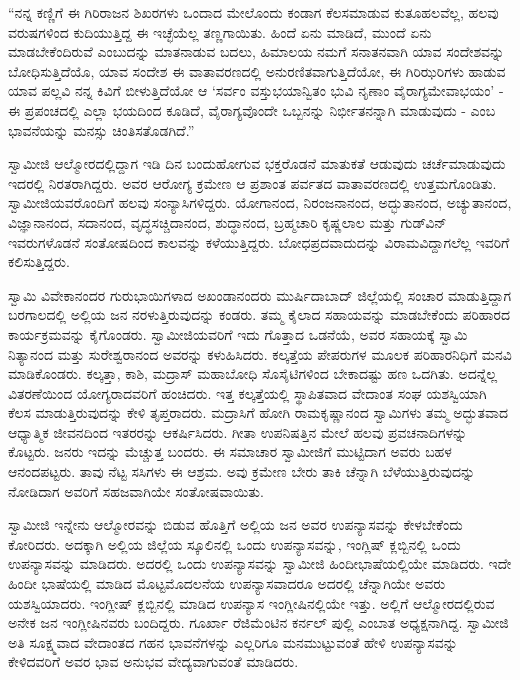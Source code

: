  “ನನ್ನ ಕಣ್ಣಿಗೆ ಈ ಗಿರಿರಾಜನ ಶಿಖರಗಳು ಒಂದಾದ ಮೇಲೊಂದು ಕಂಡಾಗ ಕೆಲಸಮಾಡುವ ಕುತೂಹಲವೆಲ್ಲ, ಹಲವು ವರುಷಗಳಿಂದ ಕುದಿಯುತ್ತಿದ್ದ ಈ ಇಚ್ಛೆಯೆಲ್ಲ ತಣ್ಣಗಾಯಿತು. ಹಿಂದೆ ಏನು ಮಾಡಿದೆ, ಮುಂದೆ ಏನು ಮಾಡಬೇಕೆಂದಿರುವೆ ಎಂಬುದನ್ನು ಮಾತನಾಡುವ ಬದಲು, ಹಿಮಾಲಯ ನಮಗೆ ಸನಾತನವಾಗಿ ಯಾವ ಸಂದೇಶವನ್ನು ಬೋಧಿಸುತ್ತಿದೆಯೊ, ಯಾವ ಸಂದೇಶ ಈ ವಾತಾವರಣದಲ್ಲಿ ಅನುರಣಿತವಾಗುತ್ತಿದೆಯೋ, ಈ ಗಿರಿಝರಿಗಳು ಹಾಡುವ ಯಾವ ಪಲ್ಲವಿ ನನ್ನ ಕಿವಿಗೆ ಬೀಳುತ್ತಿದೆಯೋ ಆ ‘ಸರ್ವಂ ವಸ್ತುಭಯಾನ್ವಿತಂ ಭುವಿ ನೃಣಾಂ ವೈರಾಗ್ಯಮೇವಾಭಯಂ’ - ಈ ಪ್ರಪಂಚದಲ್ಲಿ ಎಲ್ಲಾ ಭಯದಿಂದ ಕೂಡಿದೆ, ವೈರಾಗ್ಯವೊಂದೇ ಒಬ್ಬನನ್ನು ನಿರ್ಭೀತನನ್ನಾಗಿ ಮಾಡುವುದು - ಎಂಬ ಭಾವನೆಯನ್ನು ಮನಸ್ಸು ಚಿಂತಿಸತೊಡಗಿದೆ.” 

 ಸ್ವಾಮೀಜಿ ಆಲ್ಮೋರದಲ್ಲಿದ್ದಾಗ ಇಡಿ ದಿನ ಬಂದುಹೋಗುವ ಭಕ್ತರೊಡನೆ ಮಾತುಕತೆ ಆಡುವುದು ಚರ್ಚೆಮಾಡುವುದು ಇದರಲ್ಲಿ ನಿರತರಾಗಿದ್ದರು. ಅವರ ಆರೋಗ್ಯ ಕ್ರಮೇಣ ಆ ಪ್ರಶಾಂತ ಪರ್ವತದ ವಾತಾವರಣದಲ್ಲಿ ಉತ್ತಮಗೊಂಡಿತು. ಸ್ವಾಮೀಜಿಯವರೊಂದಿಗೆ ಹಲವು ಸಂನ್ಯಾಸಿಗಳಿದ್ದರು. ಯೋಗಾನಂದ, ನಿರಂಜನಾನಂದ, ಅದ್ಭುತಾನಂದ, ಅಚ್ಯುತಾನಂದ, ವಿಜ್ಞಾನಾನಂದ, ಸದಾನಂದ, ವೃದ್ಧಸಚ್ಚಿದಾನಂದ, ಶುದ್ಧಾನಂದ, ಬ್ರಹ್ಮಚಾರಿ ಕೃಷ್ಣಲಾಲ ಮತ್ತು ಗುಡ್‍ವಿನ್ ಇವರುಗಳೊಡನೆ ಸಂತೋಷದಿಂದ ಕಾಲವನ್ನು ಕಳೆಯುತ್ತಿದ್ದರು. ಬೋಧಪ್ರದವಾದುದನ್ನು ವಿರಾಮವಿದ್ದಾಗಲೆಲ್ಲ ಇವರಿಗೆ ಕಲಿಸುತ್ತಿದ್ದರು. 

 ಸ್ವಾಮಿ ವಿವೇಕಾನಂದರ ಗುರುಭಾಯಿಗಳಾದ ಅಖಂಡಾನಂದರು ಮುರ್ಷಿದಾಬಾದ್ ಜಿಲ್ಲೆಯಲ್ಲಿ ಸಂಚಾರ ಮಾಡುತ್ತಿದ್ದಾಗ ಬರಗಾಲದಲ್ಲಿ ಅಲ್ಲಿಯ ಜನ ನರಳುತ್ತಿರುವುದನ್ನು ಕಂಡರು. ತಮ್ಮ ಕೈಲಾದ ಸಹಾಯವನ್ನು ಮಾಡಬೇಕೆಂದು ಪರಿಹಾರದ ಕಾರ್ಯಕ್ರಮವನ್ನು ಕೈಗೊಂಡರು. ಸ್ವಾಮೀಜಿಯವರಿಗೆ ಇದು ಗೊತ್ತಾದ ಒಡನೆಯೆ, ಅವರ ಸಹಾಯಕ್ಕೆ ಸ್ವಾಮಿ ನಿತ್ಯಾನಂದ ಮತ್ತು ಸುರೇಶ್ವರಾನಂದ ಅವರನ್ನು ಕಳುಹಿಸಿದರು. ಕಲ್ಕತ್ತೆಯ ಪೇಪರುಗಳ ಮೂಲಕ ಪರಿಹಾರನಿಧಿಗೆ ಮನವಿ ಮಾಡಿಕೊಂಡರು. ಕಲ್ಕತ್ತಾ, ಕಾಶಿ, ಮದ್ರಾಸ್ ಮಹಾಬೋಧಿ ಸೊಸೈಟಿಗಳಿಂದ ಬೇಕಾದಷ್ಟು ಹಣ ಒದಗಿತು. ಅದನ್ನೆಲ್ಲ ವಿತರಣೆಯಿಂದ ಯೋಗ್ಯರಾದವರಿಗೆ ಹಂಚಿದರು. ಇತ್ತ ಕಲ್ಕತ್ತೆಯಲ್ಲಿ ಸ್ಥಾಪಿತವಾದ ವೇದಾಂತ ಸಂಘ ಯಶಸ್ವಿಯಾಗಿ ಕೆಲಸ ಮಾಡುತ್ತಿರುವುದನ್ನು ಕೇಳಿ ತೃಪ್ತರಾದರು. ಮದ್ರಾಸಿಗೆ ಹೋಗಿ ರಾಮಕೃಷ್ಣಾನಂದ ಸ್ವಾಮಿಗಳು ತಮ್ಮ ಅದ್ಭುತವಾದ ಆಧ್ಯಾತ್ಮಿಕ ಜೀವನದಿಂದ ಇತರರನ್ನು ಆಕರ್ಷಿಸಿದರು. ಗೀತಾ ಉಪನಿಷತ್ತಿನ ಮೇಲೆ ಹಲವು ಪ್ರವಚನಾದಿಗಳನ್ನು ಕೊಟ್ಟರು. ಜನರು ಇದನ್ನು ಮೆಚ್ಚುತ್ತ ಬಂದರು. ಈ ಸಮಾಚಾರ ಸ್ವಾಮೀಜಿಗೆ ಮುಟ್ಟಿದಾಗ ಅವರು ಬಹಳ ಆನಂದಪಟ್ಟರು. ತಾವು ನೆಟ್ಟ ಸಸಿಗಳು ಈ ಆಶ್ರಮ. ಅವು ಕ್ರಮೇಣ ಬೇರು ತಾಕಿ ಚೆನ್ನಾಗಿ ಬೆಳೆಯುತ್ತಿರುವುದನ್ನು ನೋಡಿದಾಗ ಅವರಿಗೆ ಸಹಜವಾಗಿಯೇ ಸಂತೋಷವಾಯಿತು. 

 ಸ್ವಾಮೀಜಿ ಇನ್ನೇನು ಆಲ್ಮೋರವನ್ನು ಬಿಡುವ ಹೊತ್ತಿಗೆ ಅಲ್ಲಿಯ ಜನ ಅವರ ಉಪನ್ಯಾಸವನ್ನು ಕೇಳಬೇಕೆಂದು ಕೋರಿದರು. ಅದಕ್ಕಾಗಿ ಅಲ್ಲಿಯ ಜಿಲ್ಲೆಯ ಸ್ಕೂಲಿನಲ್ಲಿ ಒಂದು ಉಪನ್ಯಾಸವನ್ನು, ಇಂಗ್ಲಿಷ್ ಕ್ಲಬ್ಬಿನಲ್ಲಿ ಒಂದು ಉಪನ್ಯಾಸವನ್ನು ಮಾಡಿದರು. ಅದರಲ್ಲಿ ಒಂದು ಉಪನ್ಯಾಸವನ್ನು ಸ್ವಾಮೀಜಿ ಹಿಂದೀಭಾಷೆಯಲ್ಲಿಯೇ ಮಾಡಿದರು. ಇದೇ ಹಿಂದೀ ಭಾಷೆಯಲ್ಲಿ ಮಾಡಿದ ಮೊಟ್ಟಮೊದಲನೆಯ ಉಪನ್ಯಾಸವಾದರೂ ಅದರಲ್ಲಿ ಚೆನ್ನಾಗಿಯೇ ಅವರು ಯಶಸ್ವಿಯಾದರು. ಇಂಗ್ಲೀಷ್ ಕ್ಲಬ್ಬಿನಲ್ಲಿ ಮಾಡಿದ ಉಪನ್ಯಾಸ ಇಂಗ್ಲೀಷಿನಲ್ಲಿಯೇ ಇತ್ತು. ಅಲ್ಲಿಗೆ ಆಲ್ಮೋರದಲ್ಲಿರುವ ಅನೇಕ ಜನ ಇಂಗ್ಲೀಷಿನವರು ಬಂದಿದ್ದರು. ಗೂರ್ಖಾ ರೆಜಿಮೆಂಟಿನ ಕರ್ನಲ್ ಪುಲ್ಲಿ ಎಂಬಾತ ಅಧ್ಯಕ್ಷನಾಗಿದ್ದ. ಸ್ವಾಮೀಜಿ ಅತಿ ಸೂಕ್ಷ್ಮವಾದ ವೇದಾಂತದ ಗಹನ ಭಾವನೆಗಳನ್ನು ಎಲ್ಲರಿಗೂ ಮನಮುಟ್ಟುವಂತೆ ಹೇಳಿ ಉಪನ್ಯಾಸವನ್ನು ಕೇಳಿದವರಿಗೆ ಅವರ ಭಾವ ಅನುಭವ ವೇದ್ಯವಾಗುವಂತೆ ಮಾಡಿದರು. 

